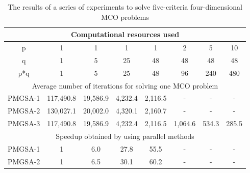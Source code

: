 \documentclass[review]{elsarticle}
\begin{document}
\begin{table}[ht]
\centering
\caption{The results of a series of experiments to solve five-criteria four-dimensional MCO problems}
\label{tab:2}
\begin{adjustbox}{max width=\textwidth}
\begin{tabular}{cccccccc}
\hline
\multicolumn{8}{c}{Computational resources used}                                                                                                                           \\ \hline
p                   & 1                     & 1                   & 1                  & 1                  & 2                  & 5                  & 10                 \\
q                   & 1                     & 5                   & 25                 & 48                 & 48                 & 48                 & 48                 \\
p*q                 & 1                     & 5                   & 25                 & 48                 & 96                 & 240                & 480                \\ \hline
\multicolumn{8}{c}{Average number of iterations for solving one   MCO problem}                                                                                             \\ \hline
PMGSA-1             & 117,490.8             & 19,586.9            & 4,232.4            & 2,116.5            & -                  & -                  & -                  \\
PMGSA-2             & 130,027.1             & 20,002.0            & 4,320.1            & 2,160.7            & -                  & -                  & -                  \\
PMGSA-3             & 117,490.8             & 19,586.9            & 4,232.4            & 2,116.5            & 1,064.6            & 534.3              & 285.5              \\ \hline
\multicolumn{8}{c}{Speedup obtained by using parallel methods}                                                                                                             \\ \hline
PMGSA-1             & 1                     & 6.0                 & 27.8               & 55.5               & -                  & -                  & -                  \\
PMGSA-2             & 1                     & 6.5                 & 30.1               & 60.2               & -                  & -                  & -                  \\

\end{tabular}
\end{adjustbox}
\end{table}
\end{document}
